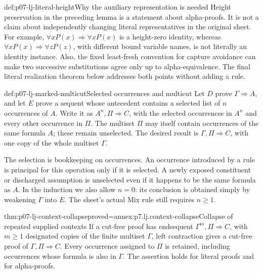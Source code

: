 \begin{hbwarning}{def:p07-lj-literal-height}{Why the auxiliary representation is needed}
Height preservation in the preceding lemma is a statement about
alpha-proofs.  It is not a claim about independently changing literal
representatives in the original sheet.  For example,
\(\forall xP(x)\Rightarrow\forall xP(x)\) is a height-zero identity,
whereas \(\forall xP(x)\Rightarrow\forall zP(z)\), with different bound
variable names, is not literally an identity instance.  Also, the fixed
least-fresh convention for capture avoidance can make two successive
substitutions agree only up to alpha-equivalence.  The final literal
realization theorem below addresses both points without adding a rule.
\end{hbwarning}

\begin{hbdefinition}{def:p07-lj-marked-multicut}{Selected occurrences and multicut}
Let \(D\) prove \(\Gamma\Rightarrow A\), and let \(E\) prove a sequent
whose antecedent contains a selected list of \(n\) occurrences of \(A\).
Write it as \(A^n,\Pi\Rightarrow C\), with the selected occurrences in
\(A^n\) and every other occurrence in \(\Pi\).  The multiset \(\Pi\)
may itself contain occurrences of the same formula \(A\); these remain
unselected.  The desired result is \(\Gamma,\Pi\Rightarrow C\), with
one copy of the whole multiset \(\Gamma\).

The selection is bookkeeping on occurrences.  An occurrence introduced by
a rule is principal for this operation only if it is selected.  A newly
exposed constituent or discharged assumption is unselected even if it
happens to be the same formula as \(A\).  In the induction we also allow
\(n=0\): its conclusion is obtained simply by weakening \(\Gamma\)
into \(E\).  The sheet's actual Mix rule still requires \(n\geq1\).
\end{hbdefinition}

\begin{hblemma}{thm:p07-lj-context-collapse}{proved=annex:p7.lj.context-collapse}{Collapse of repeated supplied contexts}
If a cut-free proof has endsequent \(\Gamma^m,\Pi\Rightarrow C\), with
\(m\geq1\) designated copies of the finite multiset \(\Gamma\), left
contraction gives a cut-free proof of \(\Gamma,\Pi\Rightarrow C\).
Every occurrence assigned to \(\Pi\) is retained, including occurrences
whose formula is also in \(\Gamma\).  The assertion holds for literal
proofs and for alpha-proofs.
\end{hblemma}

